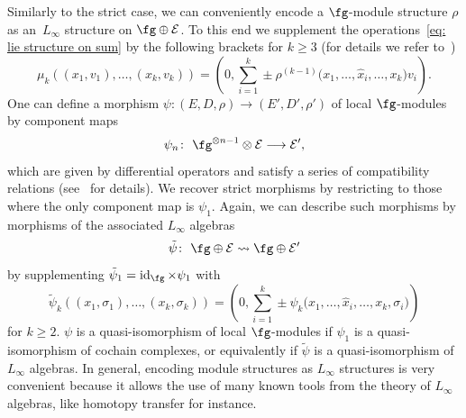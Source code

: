 \documentclass[10pt,a4paper]{amsart}
\numberwithin{equation}{section}
\def\cE{\mathcal E}\def\cF{\mathcal F}\def\cG{\mathcal G}\def\cH{\mathcal H}
\DeclareMathOperator{\id}{id}
\begin{document}
Similarly to the strict case, we can conveniently encode a $\fg$-module structure $\rho$ as an~$L_\infty$ structure on $\fg \oplus \cE$. To this end we supplement the operations~\eqref{eq: lie structure on sum} by the following brackets for $k\geq3$ (for details we refer to~\cite{Allocca, Lada})
\begin{equation*}
\mu_k((x_1,v_1),\dots,(x_k,v_k)) = \left( 0 , \sum_{i=1}^{k} \pm \rho^{(k-1)}\big(x_1,\dots,\hat{x}_i,\dots,x_k\big)v_i \right).
\end{equation*}
One can define a morphism $\psi \colon (E,D,\rho) \longrightarrow (E',D',\rho')$ of local $\fg$-modules by component maps
\begin{equation*}
\psi_n \colon \ \fg^{\otimes n-1} \otimes \cE \longrightarrow \cE' ,
\end{equation*}
which are given by differential operators and satisfy a series of compatibility relations (see~\cite{Allocca} for details). We recover strict morphisms by restricting to those where the only component map is $\psi_1$. Again, we can describe such morphisms by morphisms of the associated $L_\infty$ algebras
\begin{equation*}
\tilde{\psi} \colon \ \fg \oplus \cE \rightsquigarrow \fg \oplus \cE'
\end{equation*}
by supplementing $\tilde{\psi}_1 = \id_{\fg} \times \psi_1$ with
\begin{equation*}
\tilde{\psi}_k ((x_1,\sigma_1) , \dots , (x_k, \sigma_k)) = \left(0, \sum_{i=1}^{k} \pm \psi_k\big(x_1, \dots , \hat{x}_i , \dots , x_k , \sigma_i \big)\right)
\end{equation*}
for $k \geq 2$. $\psi$ is a quasi-isomorphism of local $\fg$-modules if $\psi_1$ is a quasi-isomorphism of cochain complexes, or equivalently if $\tilde{\psi}$ is a quasi-isomorphism of $L_\infty$ algebras. In general, encoding module structures as $L_\infty$ structures is very convenient because it allows the use of many known tools from the theory of $L_\infty$ algebras, like homotopy transfer for instance.
\end{document}

